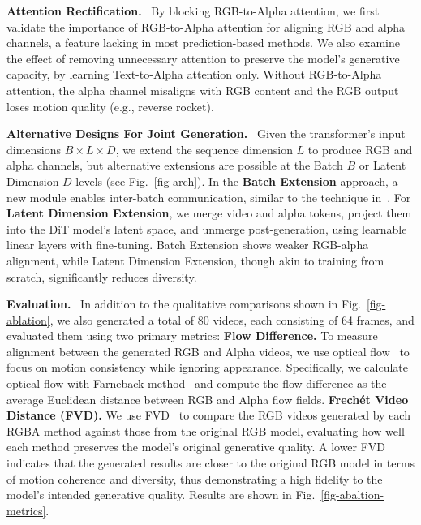 \vspace{0.5em}
\noindent\textbf{Attention Rectification.}~
By blocking RGB-to-Alpha attention, we first validate the importance of RGB-to-Alpha attention for aligning RGB and alpha channels, a feature lacking in most prediction-based methods. We also examine the effect of removing unnecessary attention to preserve the model's generative capacity, by learning Text-to-Alpha attention only.
Without RGB-to-Alpha attention, the alpha channel misaligns with RGB content %
and the RGB output loses motion quality (e.g., reverse rocket).

\vspace{0.5em}
\noindent\textbf{Alternative Designs For Joint Generation.}~
Given the transformer’s input dimensions \( B \times L \times D \), we extend the sequence dimension \( L \) to produce RGB and alpha channels, but alternative extensions are possible at the Batch \( B \) or Latent Dimension \( D \) levels (see Fig.~\ref{fig-arch}). In the \textbf{Batch Extension} approach, a new module enables inter-batch communication, similar to the technique in~\cite{vainer2024collaborative}. For \textbf{Latent Dimension Extension}, we merge video and alpha tokens, project them into the DiT model’s latent space, and unmerge post-generation, using learnable linear layers with fine-tuning. Batch Extension shows weaker RGB-alpha alignment, while Latent Dimension Extension, though akin to training from scratch, significantly reduces diversity.

\vspace{0.5em}
\noindent\textbf{Evaluation.}~
In addition to the qualitative comparisons shown in Fig.~\ref{fig-ablation}, we also generated a total of 80 videos, each consisting of 64 frames, and evaluated them using two primary metrics:
\textbf{Flow Difference.} To measure alignment between the generated RGB and Alpha videos, we use optical flow~\cite{horn1981determining} to focus on motion consistency while ignoring appearance. Specifically, we calculate optical flow with Farneback method~\cite{farneback2003two} and compute the flow difference as the average Euclidean distance between RGB and Alpha flow fields.
\textbf{Frechét Video Distance (FVD).} We use FVD~\cite{unterthiner2019fvd} to compare the RGB videos generated by each RGBA method against those from the original RGB model, evaluating how well each method preserves the model's original generative quality. A lower FVD indicates that the generated results are closer to the original RGB model in terms of motion coherence and diversity, thus demonstrating a high fidelity to the model's intended generative quality.
Results are shown in Fig.~\ref{fig-abaltion-metrics}.

